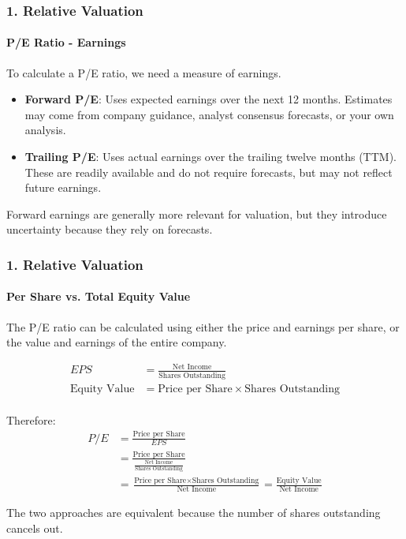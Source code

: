\documentclass{beamer}
\begin{document}
\begin{frame}[t]
    \frametitle{1. Relative Valuation}
    \framesubtitle{P/E Ratio - Earnings}

        To calculate a P/E ratio, we need a measure of earnings.
        
        \vspace{1em}
        
        \begin{itemize}
            \item \textbf{Forward P/E}: Uses expected earnings over the next
            12 months. Estimates may come from company guidance, analyst
            consensus forecasts, or your own analysis.
        
            \item \textbf{Trailing P/E}: Uses actual earnings over the
            trailing twelve months (TTM). These are readily available
            and do not require forecasts, but may not reflect future
            earnings.
        \end{itemize}
        
        \vspace{1em}
        
        Forward earnings are generally more relevant for valuation,
        but they introduce uncertainty because they rely on forecasts.

\end{frame}

\begin{frame}[t]
    \frametitle{1. Relative Valuation}
    \framesubtitle{Per Share vs. Total Equity Value}

    The P/E ratio can be calculated using either the price
    and earnings per share, or the value and earnings of
    the entire company.

    {\footnotesize
    \begin{align*}
    EPS &= \frac{\text{Net Income}}{\text{Shares Outstanding}}\\
    \text{Equity Value} &= \text{Price per Share} \times \text{Shares Outstanding}\\
    \end{align*}}

    Therefore:
    {\footnotesize
    \begin{align*}
        P/E &= \frac{\text{Price per Share}}{EPS}\\
            &= \frac{\text{Price per Share}}
            {\frac{\text{Net Income}}{\text{Shares Outstanding}}}\\
            &= \frac{\text{Price per Share}\times
            \text{Shares Outstanding}}{\text{Net Income}} = \boxed{\frac{\text{Equity Value}}{\text{Net Income}}}
    \end{align*}}

    The two approaches are equivalent because the number of
    shares outstanding cancels out.

\end{frame}
\end{document}
